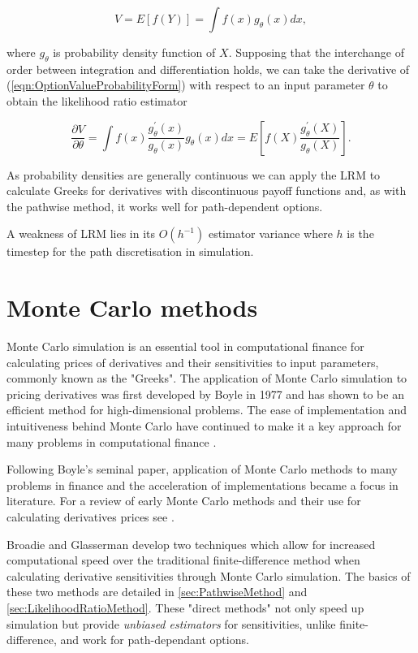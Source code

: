 \begin{equation} \label{eqn:OptionValueProbabilityForm}
    V = E[f(Y)] = \int f(x) g_\theta (x) dx,
\end{equation}

where $g_\theta$ is probability density function of $X$. Supposing that the interchange of order between integration and differentiation holds, we can take the derivative of (\ref{eqn:OptionValueProbabilityForm}) with respect to an input parameter $\theta$ to obtain the likelihood ratio estimator

\begin{equation} \label{eqn:LRUnbiasedEstimate}
    \frac{\partial V}{\partial \theta} = \int f(x) \frac{g^\prime_\theta(x)}{g_\theta(x)} g_\theta(x)dx = E\left[f(X) \frac{g^\prime_\theta(X)}{g_\theta(X)} \right].
\end{equation}

As probability densities are generally continuous we can apply the LRM to calculate Greeks for derivatives with discontinuous payoff functions and, as with the pathwise method, it works well for path-dependent options.

A weakness of LRM lies in its $O(h^{-1})$ estimator variance where $h$ is the timestep for the path discretisation in simulation.

\section{Monte Carlo methods}
Monte Carlo simulation is an essential tool in computational finance for calculating prices of derivatives and their sensitivities to input parameters, commonly known as the "Greeks". The application of Monte Carlo simulation to pricing derivatives was first developed by Boyle in 1977 \cite{BOYLE1977323} and has shown to be an efficient method for high-dimensional problems. The ease of implementation and intuitiveness behind Monte Carlo have continued to make it a key approach for many problems in computational finance \cite{glasserman2004monte}.

Following Boyle's seminal paper, application of Monte Carlo methods to many problems in finance and the acceleration of implementations became a focus in literature. For a review of early Monte Carlo methods and their use for calculating derivatives prices see \cite{boyle1997monte}.

Broadie and Glasserman \cite{broadie1996estimating} develop two techniques which allow for increased computational speed over the traditional finite-difference method when calculating derivative sensitivities through Monte Carlo simulation. The basics of these two methods are detailed in \ref{sec:PathwiseMethod} and \ref{sec:LikelihoodRatioMethod}. These "direct methods" not only speed up simulation but provide \textit{unbiased estimators} for sensitivities, unlike finite-difference, and work for path-dependant options.


